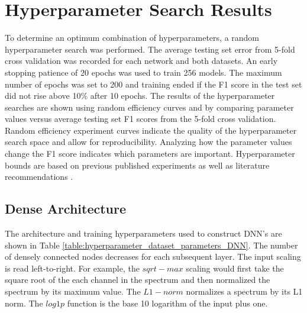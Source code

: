 \section{Hyperparameter Search Results}

To determine an optimum combination of hyperparameters, a random hyperparameter search was performed. The average testing set error from 5-fold cross validation was recorded for each network and both datasets. An early stopping patience of 20 epochs was used to train 256 models. The maximum number of epochs was set to 200 and training ended if the F1 score in the test set did not rise above 10$\%$ after 10 epochs. The results of the hyperparameter searches are shown using random efficiency curves and by comparing parameter values versus average testing set F1 scores from the 5-fold cross validation. Random efficiency experiment curves indicate the quality of the hyperparameter search space and allow for reproducibility. Analyzing how the parameter values change the F1 score indicates which parameters are important. Hyperparameter bounds are based on previous published experiments as well as literature recommendations \cite{kamuda2017, kamuda2018, Bengio2018}.





\subsection{Dense Architecture}

The architecture and training hyperparameters used to construct DNN's are shown in Table \ref{table:hyperparameter_dataset_parameters_DNN}. The number of densely connected nodes decreases for each subsequent layer. The input scaling is read left-to-right. For example, the $sqrt-max$ scaling would first take the square root of the each channel in the spectrum and then normalized the spectrum by its maximum value. The $L1-norm$ normalizes a spectrum by its L1 norm. The $log1p$ function is the base 10 logarithm of the input plus one.

